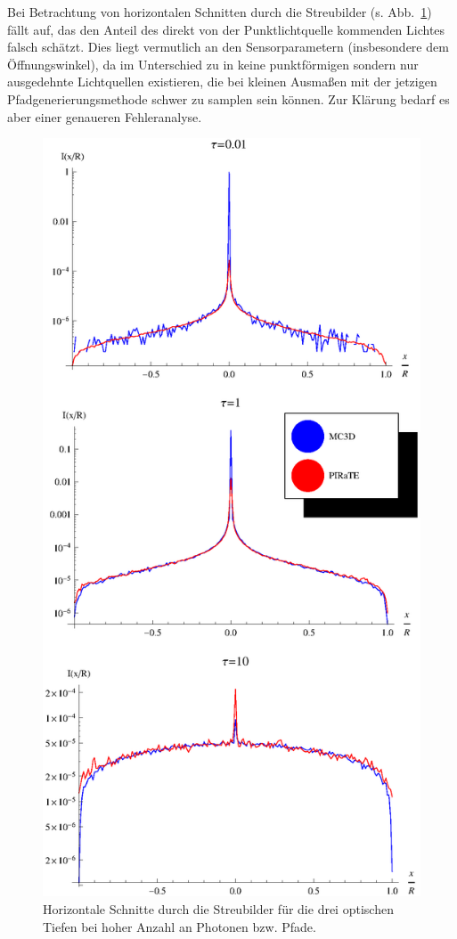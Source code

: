 	Bei Betrachtung von horizontalen Schnitten durch die Streubilder (s. Abb.~\ref{fig:sphere_image_cuts}) fällt auf, das \pirate den Anteil des direkt von der Punktlichtquelle kommenden Lichtes falsch schätzt. Dies liegt vermutlich an den Sensorparametern (insbesondere dem Öffnungswinkel), da im Unterschied zu \mctd in \pirate keine punktförmigen sondern nur ausgedehnte Lichtquellen existieren, die bei kleinen Ausmaßen mit der jetzigen Pfadgenerierungsmethode schwer zu samplen sein können. Zur Klärung bedarf es aber einer genaueren Fehleranalyse.
	
		\begin{figure}
			\centering
			\includegraphics[height=1.0\textheight]{sphere_image_cuts.eps}
			\caption{Horizontale Schnitte durch die Streubilder für die drei optischen Tiefen bei hoher Anzahl an Photonen bzw. Pfade.}
			\label{fig:sphere_image_cuts}
		\end{figure}
	
